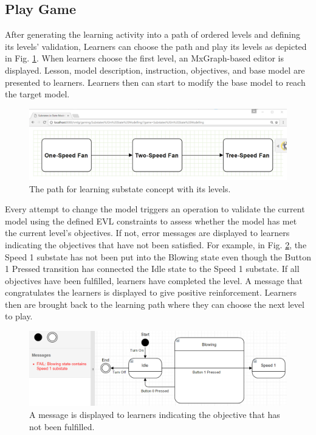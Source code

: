 \documentclass[conference]{IEEEtran}
\begin{document}
\subsection{Play Game}
After generating the learning activity into a path of ordered levels and defining its levels' validation, Learners can choose the path and play its levels as depicted in Fig. \ref{path}. When learners choose the first level, an MxGraph-based editor is displayed. Lesson, model description, instruction, objectives, and base model are presented to learners. Learners then can start to modify the base model to reach the target model. 

\begin{figure}[!t]
\centering
\includegraphics[width=\linewidth]{path}
\caption{The path for learning substate concept with its levels.}
\label{path}
\end{figure}    

Every attempt to change the model triggers an operation to validate the current model using the defined EVL constraints to assess whether the model has met the current level's objectives. If not, error messages are displayed to learners indicating the objectives that have not been satisfied. For example, in Fig. \ref{example-fail-messages}, the Speed 1 substate has not been put into the Blowing state even though the Button 1 Pressed transition has connected the Idle state to the Speed 1 substate. If all objectives have been fulfilled, learners have completed the level. A message that congratulates the learners is displayed to give positive reinforcement. Learners then are brought back to the learning path where they can choose the next level to play.  

\begin{figure}[!t]
\centering
\includegraphics[width=\linewidth]{example-fail-messages}
\caption{A message is displayed to learners indicating the objective that has not been fulfilled.}
\label{example-fail-messages}
\end{figure}  
\end{document}
